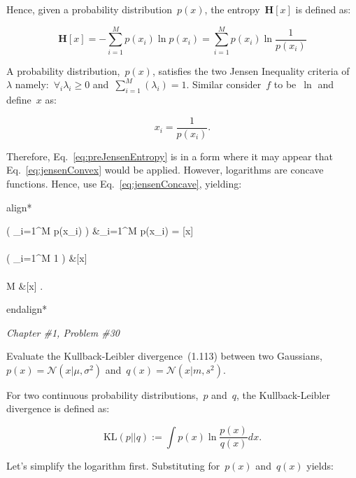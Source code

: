 \documentclass{report}
\newenvironment{aligncustom}
{ \csname align*\endcsname %
    \centering
}
{
  \csname endalign*\endcsname
}
\newcounter{subProbCount}       %
\newenvironment{problemshell}{
  \par%
  \medskip
  \leftskip=0pt\rightskip=0pt%
}
{
  \par\medskip
  \setcounter{subProbCount}{1} %
}
\newenvironment{problem}[2]
{%
  \begin{problemshell}
    \noindent \textit{Chapter \##1, Problem \##2} \\
    \bfseries  
}
{
  \end{problemshell}
}
\newcommand{\KL}{\textrm{KL}}
\begin{document}
  Hence, given a probability distribution~$p(x)$, the entropy~$\mathbf{H}[x]$ is defined as:
  
  \begin{equation}
    \mathbf{H}[x] = -\sum_{i=1}^{M} p(x_i) \ln p(x_i) = \sum_{i=1}^{M} p(x_i) \ln \frac{1}{p(x_i)}
    \label{eq:preJensenEntropy}
  \end{equation}
    
  A probability distribution,~$p(x)$, satisfies the two Jensen Inequality criteria of~$\lambda$ namely:~$\forall_{i}\lambda_i \geq 0$ and~$\sum_{i=1}^{M}\left( \lambda_i \right) = 1$.  Similar consider~$f$ to be~$\ln$ and define~$x$ as:
  
  \[ x_{i} = \frac{1}{p(x_i)} \textrm{.} \]
  
  Therefore, Eq.~\eqref{eq:preJensenEntropy} is in a form where it may appear that Eq.~\eqref{eq:jensenConvex} would be applied.  However, logarithms are concave functions.  Hence, use Eq.~\eqref{eq:jensenConcave}, yielding:

  \begin{aligncustom}
    \ln \left( \sum_{i=1}^M p(x_i)  \right) &\geq \sum_{i=1}^{M} p(x_i) \ln {} = [x] \\~\\
    \ln \left( \sum_{i=1}^M 1 \right) &\geq {}[x] \\~\\
    \ln M &\geq {}[x] \textrm{.}~~~\square
  \end{aligncustom}
 

  \newpage
  \begin{problem}{1}{30}
    Evaluate the Kullback-Leibler divergence~(1.113) between two Gaussians,~$p(x)=\mathcal{N}(x|\mu,\sigma^2)$ and~$q(x)=\mathcal{N}(x|m,s^2)$.
  \end{problem}

  For two continuous probability distributions,~$p$ and~$q$, the Kullback-Leibler divergence is defined as:
  
  \[ {\KL(p||q) := \int p(x) \ln \frac{p(x)}{q(x)}} dx \textrm{.}\]
  
  Let's simplify the logarithm first.  Substituting for~$p(x)$ and~$q(x)$ yields:
  
\end{document}
